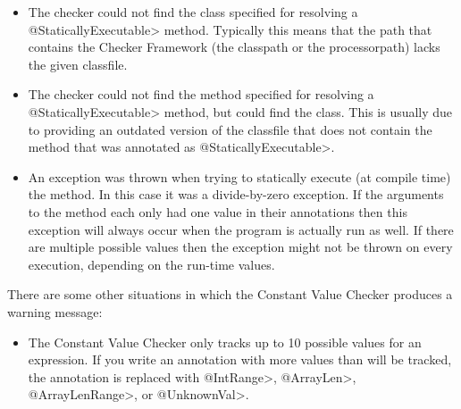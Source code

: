 \begin{sloppypar}
\begin{itemize}
\item {}

  The checker could not find the class
  specified for resolving a \<@StaticallyExecutable> method. Typically
  this means that the path that contains the Checker Framework (the
  classpath or the processorpath) lacks the given classfile.

\item {}

  The checker could not find the method  specified for
  resolving a \<@StaticallyExecutable> method, but could find the
  class. This is usually due to providing an outdated version of the
  classfile that does not contain the
  method that was annotated as \<@StaticallyExecutable>.

\item {}

  An exception was thrown when trying to statically execute (at compile time) the
  method. In this case it was a divide-by-zero exception. If the
  arguments to the method each only had one value in their annotations
  then this exception will always occur when the program is actually
  run as well. If there are multiple possible values then the exception
  might not be thrown on every execution, depending on the run-time values.

\end{itemize}
\end{sloppypar}

There are some other situations in which the Constant Value Checker produces a
warning message:

\begin{sloppypar}
\begin{itemize}
\item {}

  The Constant Value Checker only tracks up to 10 possible values for an
  expression.  If you write an annotation with more values than will be
  tracked, the annotation is replaced with \<@IntRange>, \<@ArrayLen>, \<@ArrayLenRange>, or \<@UnknownVal>.

\end{itemize}
\end{sloppypar}


